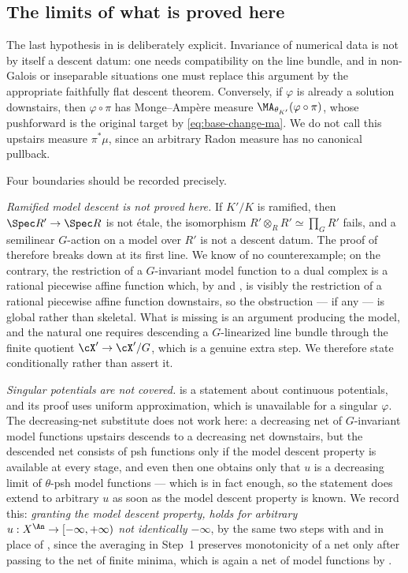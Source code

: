 \subsection{The limits of what is proved here}
\label{sec:ch30-descent-limits}

The last hypothesis in  is
deliberately explicit.  Invariance of numerical
data is not by itself a descent datum: one needs compatibility on the line
bundle, and in non-Galois or inseparable situations one must replace this
argument by the appropriate faithfully flat descent theorem.  Conversely,
if \(\varphi\) is already a solution downstairs, then
\(\varphi\circ\pi\) has Monge--Amp\`ere measure
\(\MA_{\theta_{K'}}(\varphi\circ\pi)\), whose pushforward is the original
target by \eqref{eq:base-change-ma}.  We do not call this upstairs measure
\(\pi^*\mu\), since an arbitrary Radon measure has no canonical pullback.

Four boundaries should be recorded precisely.

\emph{Ramified model descent is not proved here.}  If \(K'/K\) is
ramified, then \(\Spec R'\to\Spec R\) is not étale, the isomorphism
\(R'\otimes_RR'\simeq\prod_GR'\) fails, and a semilinear \(G\)-action on a
model over \(R'\) is not a descent datum.  The proof of
 therefore breaks down at its first line.  We
know of no counterexample; on the contrary, the restriction of a
\(G\)-invariant model function to a dual complex is a rational piecewise
affine function which, by  and
, is visibly the restriction of a rational
piecewise affine function downstairs, so the obstruction --- if any --- is
global rather than skeletal.  What is missing is an argument producing the
model, and the natural one requires descending a \(G\)-linearized line
bundle through the finite quotient \(\cX'\to\cX'/G\), which is a genuine
extra step.  We therefore state
 conditionally rather than assert it.

\emph{Singular potentials are not covered.}
 is a statement about continuous
potentials, and its proof uses uniform approximation, which is unavailable
for a singular \(\varphi\).  The decreasing-net substitute does not work
here: a decreasing net of \(G\)-invariant model functions upstairs descends
to a decreasing net downstairs, but the descended net consists of psh
functions only if the model descent property is available at every stage,
and even then one obtains only that \(u\) is a decreasing limit of
\(\theta\)-psh model functions --- which is in fact enough, so the
statement does extend to arbitrary \(u\) as soon as the model descent
property is known.  We record this: \emph{granting the model descent
property,  holds for arbitrary
\(u:X^{\An}\to[-\infty,+\infty)\) not identically \(-\infty\)}, by the same
two steps with  and
 in place of
, since the averaging in Step~1 preserves
monotonicity of a net only after passing to the net of finite minima, which
is again a net of model functions by .

